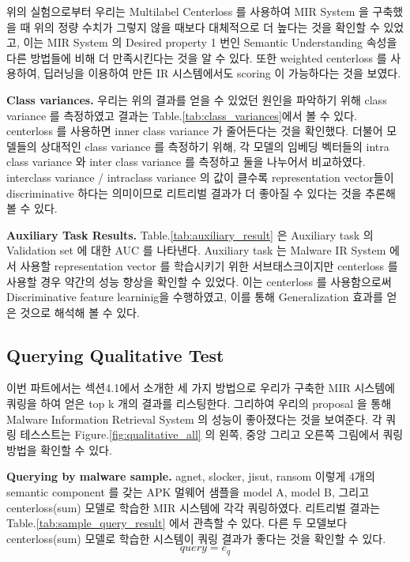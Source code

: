 위의 실험으로부터 우리는 Multilabel Centerloss 를 사용하여 MIR System 을 구축했을 때 위의 정량 수치가 그렇지 않을 때보다 대체적으로 더 높다는 것을 확인할 수 있었고, 이는 MIR System 의 Desired property 1 번인 Semantic Understanding 속성을 다른 방법들에 비해 더 만족시킨다는 것을 알 수 있다. 또한 weighted centerloss 를 사용하여, 딥러닝을 이용하여 만든 IR 시스템에서도 scoring 이 가능하다는 것을 보였다. 


\textbf{Class variances. }
우리는 위의 결과를 얻을 수 있었던 원인을 파악하기 위해 class variance 를 측정하였고 결과는 Table.\ref{tab:class_variances}에서 볼 수 있다. centerloss 를 사용하면 inner class variance 가 줄어든다는 것을 확인했다. 더불어 모델들의 상대적인 class variance 를 측정하기 위해, 각 모델의 임베딩 벡터들의 intra class variance 와 inter class variance 를 측정하고 둘을 나누어서 비교하였다. interclass variance / intraclass variance 의 값이 클수록 representation vector들이 discriminative 하다는 의미이므로 리트리벌 결과가 더 좋아질 수 있다는 것을 추론해볼 수 있다. 

\textbf{Auxiliary Task Results. }
Table.\ref{tab:auxiliary_result} 은 Auxiliary task 의 Validation set 에 대한 AUC 를 나타낸다. Auxiliary task 는 Malware IR System 에서 사용할 representation vector 를 학습시키기 위한 서브태스크이지만 centerloss 를 사용할 경우 약간의 성능 향상을 확인할 수 있었다. 이는 centerloss 를 사용함으로써 Discriminative feature learninig\cite{wen2016discriminative}을 수행하였고, 이를 통해 Generalization 효과를 얻은 것으로 해석해 볼 수 있다.


\subsection{Querying Qualitative Test}
이번 파트에서는 섹션4.1에서 소개한 세 가지 방법으로 우리가 구축한 MIR 시스템에 쿼링을 하여 얻은 top k 개의 결과를 리스팅한다. 그리하여 우리의 proposal 을 통해 Malware Information Retrieval System 의 성능이 좋아졌다는 것을 보여준다. 각 쿼링 테스스트는 Figure.\ref{fig:qualitative_all} 의 왼쪽, 중앙 그리고 오른쪽 그림에서 쿼링 방법을 확인할 수 있다.

\textbf{Querying by malware sample. }
agnet, slocker, jisut, ransom 이렇게 4개의 semantic component 를 갖는 APK 멀웨어 샘플을 model A, model B, 그리고 centerloss(sum) 모델로 학습한 MIR 시스템에 각각 쿼링하였다. 리트리벌 결과는 Table.\ref{tab:sample_query_result} 에서 관측할 수 있다. 다른 두 모델보다 centerloss(sum) 모델로 학습한 시스템이 쿼링 결과가 좋다는 것을 확인할 수 있다. 
\[
   query = e_q 
\]


